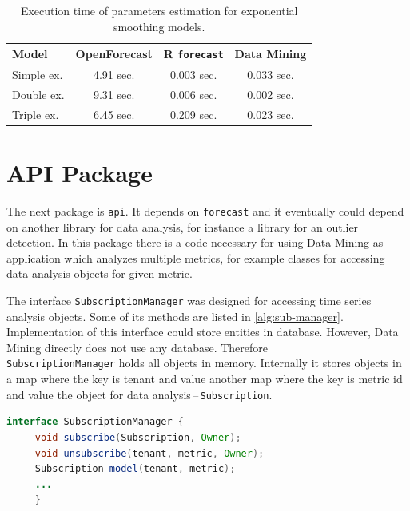         \begin{table}[h]
            \begin{center}
                \begin{tabular}{l|c|c|c}
                    \textbf{Model} & \textbf{OpenForecast} & \textbf{R \texttt{forecast}} &
                        \textbf{Data Mining}\\ \hline \hline
                    Simple ex. & 4.91 sec. & 0.003 sec. & 0.033 sec.\\
                    Double ex. & 9.31 sec. & 0.006 sec. & 0.002 sec. \\
                    Triple ex. & 6.45 sec. & 0.209 sec. & 0.023 sec. \\
                \end{tabular}
                \caption{Execution time of parameters estimation for exponential smoothing models.}
                \label{tab:datamining-perf}
            \end{center}
        \end{table}

    \section{API Package}
    The next package is \texttt{api}. It depends on \texttt{forecast} and it eventually could
    depend on another library for data analysis, for instance a library for an outlier detection. In this package there
    is a code necessary for using Data Mining as application which analyzes multiple metrics, for example classes for
    accessing data analysis objects for given metric.

    The interface \texttt{SubscriptionManager} was designed for accessing time series analysis objects. Some of its
    methods are listed in \ref{alg:sub-manager}. Implementation of this interface could store entities in database.
    However, Data Mining directly does not use any database. Therefore \\ \texttt{SubscriptionManager} holds all objects
    in memory. Internally it stores objects in a map where the key is tenant and value another map where the key is
    metric id and value the object for data analysis\,--\,\texttt{Subscription}.

    \begin{lstlisting}[caption={Interface \texttt{SubscriptionManager}.}, language=Java, label={alg:sub-manager}]
interface SubscriptionManager {
     void subscribe(Subscription, Owner);
     void unsubscribe(tenant, metric, Owner);
     Subscription model(tenant, metric);
     ...
     }
    \end{lstlisting}

